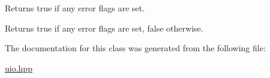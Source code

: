 Returns {\ttfamily true} if any error flags are set. 

\begin{DoxyReturn}{Returns}
{\ttfamily true} if any error flags are set, {\ttfamily false} otherwise. 
\end{DoxyReturn}


The documentation for this class was generated from the following file\+:\begin{DoxyCompactItemize}
\item 
\hyperlink{uio_8hpp}{uio.\+hpp}\end{DoxyCompactItemize}

